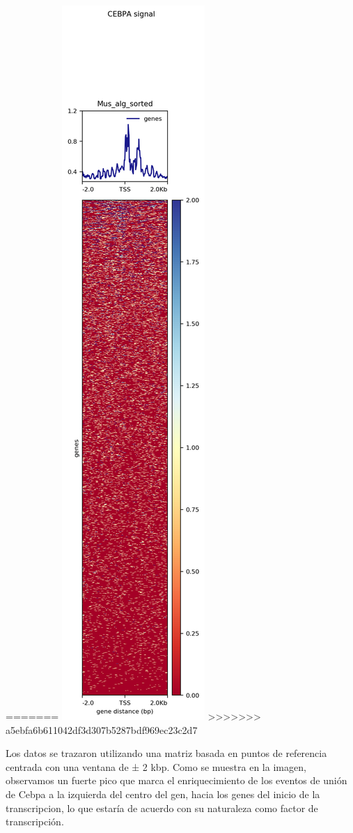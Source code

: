 \documentclass[
]{article}
\begin{document}
=======
\includegraphics{./T04_images/CEBPA_genes2.png}
>>>>>>> a5ebfa6b611042df3d307b5287bdf969ec23c2d7

Los datos se trazaron utilizando una matriz basada en puntos de
referencia centrada con una ventana de ± 2 kbp. Como se muestra en la
imagen, observamos un fuerte pico que marca el enriquecimiento de los
eventos de unión de Cebpa a la izquierda del centro del gen, hacia los
genes del inicio de la transcripcion, lo que estaría de acuerdo con su
naturaleza como factor de transcripción.
\end{document}
